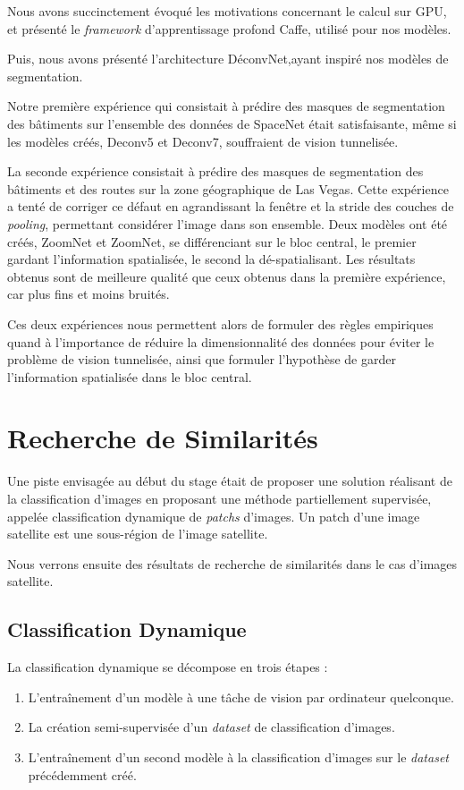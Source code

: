 \documentclass[a4paper, 11pt]{report}
\begin{document}
Nous avons succinctement évoqué les motivations concernant le calcul sur GPU, et présenté le \emph{framework} d'apprentissage profond Caffe, utilisé pour nos modèles.

Puis, nous avons présenté l'architecture DéconvNet,ayant inspiré nos modèles de segmentation.

Notre première expérience qui consistait à prédire des masques de segmentation des bâtiments sur l'ensemble des données de SpaceNet était satisfaisante, même si les modèles créés, Deconv5 et Deconv7, souffraient de vision tunnelisée.

La seconde expérience consistait à prédire des masques de segmentation des bâtiments et des routes sur la zone géographique de Las Vegas.
Cette expérience a tenté de corriger ce défaut en agrandissant la fenêtre et la stride des couches de \emph{pooling}, permettant considérer l'image dans son ensemble.
Deux modèles ont été créés, ZoomNet et ZoomNet, se différenciant sur le bloc central, le premier gardant l'information spatialisée, le second la dé-spatialisant.
Les résultats obtenus sont de meilleure qualité que ceux obtenus dans la première expérience, car plus fins et moins bruités.

Ces deux expériences nous permettent alors de formuler des règles empiriques quand à l'importance de réduire la dimensionnalité des données pour éviter le problème de vision tunnelisée, ainsi que formuler l'hypothèse de garder l'information spatialisée dans le bloc central.
\section{Recherche de Similarités}

Une piste envisagée au début du stage était de proposer une solution réalisant de la classification d'images en proposant une méthode partiellement supervisée, appelée classification dynamique de \emph{patchs} d'images.
Un patch d'une image satellite est une sous-région de l'image satellite.

Nous verrons ensuite des résultats de recherche de similarités dans le cas d'images satellite.

\subsection{Classification Dynamique}
La classification dynamique se décompose en trois étapes :
\begin{enumerate}
	\item L'entraînement d'un modèle à une tâche de vision par ordinateur quelconque.
	\item La création semi-supervisée d'un \emph{dataset} de classification d'images.
	\item L'entraînement d'un second modèle à la classification d'images sur le \emph{dataset} précédemment créé.
\end{enumerate}
\end{document}
